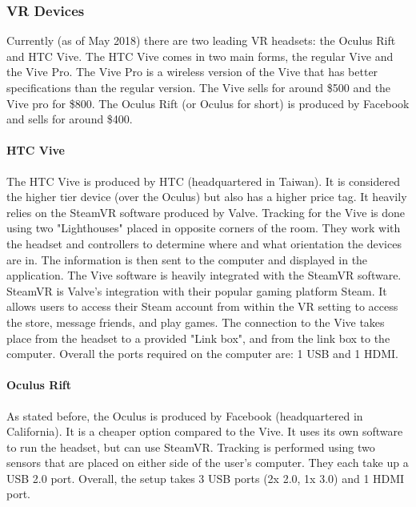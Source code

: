 
\subsubsection{VR Devices}

	Currently (as of May 2018) there are two leading VR headsets: the Oculus Rift and HTC Vive.  The HTC Vive comes in two main forms, the regular Vive and the Vive Pro.  The Vive Pro is a wireless version of the Vive that has better specifications than the regular version.  The Vive sells for around \$500 and the Vive pro for \$800. The Oculus Rift (or Oculus for short) is produced by Facebook and sells for around \$400.

	\paragraph{HTC Vive}

		The HTC Vive is produced by HTC (headquartered in Taiwan).  It is considered the higher tier device (over the Oculus) but also has a higher price tag.  It heavily relies on the SteamVR software produced by Valve.  Tracking for the Vive is done using two "Lighthouses" placed in opposite corners of the room.  They work with the headset and controllers to determine where and what orientation the devices are in.  The information is then sent to the computer and displayed in the application.  The Vive software is heavily integrated with the SteamVR software.  SteamVR is Valve's integration with their popular gaming platform Steam.  It allows users to access their Steam account from within the VR setting to access the store, message friends, and play games.  The connection to the Vive takes place from the headset to a provided "Link box", and from the link box to the computer.  Overall the ports required on the computer are: 1 USB and 1 HDMI.

	\paragraph{Oculus Rift}

		As stated before, the Oculus is produced by Facebook (headquartered in California).  It is a cheaper option compared to the Vive.  It uses its own software to run the headset, but can use SteamVR.  Tracking is performed using two sensors that are placed on either side of the user's computer.  They each take up a USB 2.0 port. Overall, the setup takes 3 USB ports (2x 2.0, 1x 3.0) and 1 HDMI port.
